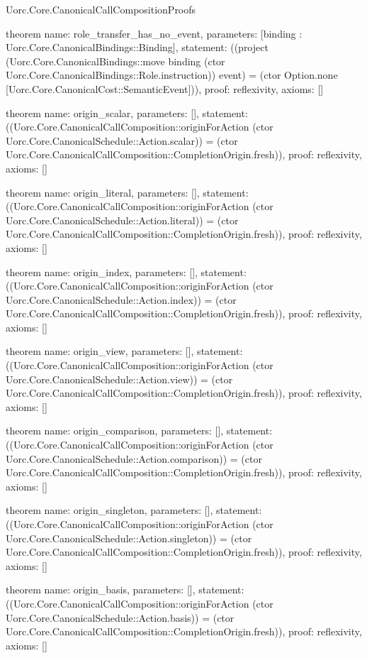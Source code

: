 \begin{lexlean}{Uorc.Core.CanonicalCallCompositionProofs}
\begin{semanticmodule}
theorem{
  name: role_transfer_has_no_event,
  parameters: [binding : Uorc.Core.CanonicalBindings::Binding],
  statement: ((project (Uorc.Core.CanonicalBindings::move binding (ctor Uorc.Core.CanonicalBindings::Role.instruction)) event) = (ctor Option.none [Uorc.Core.CanonicalCost::SemanticEvent])),
  proof: reflexivity{},
  axioms: []
}

theorem{
  name: origin_scalar,
  parameters: [],
  statement: ((Uorc.Core.CanonicalCallComposition::originForAction (ctor Uorc.Core.CanonicalSchedule::Action.scalar)) = (ctor Uorc.Core.CanonicalCallComposition::CompletionOrigin.fresh)),
  proof: reflexivity{},
  axioms: []
}

theorem{
  name: origin_literal,
  parameters: [],
  statement: ((Uorc.Core.CanonicalCallComposition::originForAction (ctor Uorc.Core.CanonicalSchedule::Action.literal)) = (ctor Uorc.Core.CanonicalCallComposition::CompletionOrigin.fresh)),
  proof: reflexivity{},
  axioms: []
}

theorem{
  name: origin_index,
  parameters: [],
  statement: ((Uorc.Core.CanonicalCallComposition::originForAction (ctor Uorc.Core.CanonicalSchedule::Action.index)) = (ctor Uorc.Core.CanonicalCallComposition::CompletionOrigin.fresh)),
  proof: reflexivity{},
  axioms: []
}

theorem{
  name: origin_view,
  parameters: [],
  statement: ((Uorc.Core.CanonicalCallComposition::originForAction (ctor Uorc.Core.CanonicalSchedule::Action.view)) = (ctor Uorc.Core.CanonicalCallComposition::CompletionOrigin.fresh)),
  proof: reflexivity{},
  axioms: []
}

theorem{
  name: origin_comparison,
  parameters: [],
  statement: ((Uorc.Core.CanonicalCallComposition::originForAction (ctor Uorc.Core.CanonicalSchedule::Action.comparison)) = (ctor Uorc.Core.CanonicalCallComposition::CompletionOrigin.fresh)),
  proof: reflexivity{},
  axioms: []
}

theorem{
  name: origin_singleton,
  parameters: [],
  statement: ((Uorc.Core.CanonicalCallComposition::originForAction (ctor Uorc.Core.CanonicalSchedule::Action.singleton)) = (ctor Uorc.Core.CanonicalCallComposition::CompletionOrigin.fresh)),
  proof: reflexivity{},
  axioms: []
}

theorem{
  name: origin_basis,
  parameters: [],
  statement: ((Uorc.Core.CanonicalCallComposition::originForAction (ctor Uorc.Core.CanonicalSchedule::Action.basis)) = (ctor Uorc.Core.CanonicalCallComposition::CompletionOrigin.fresh)),
  proof: reflexivity{},
  axioms: []
}


\end{semanticmodule}
\end{lexlean}
